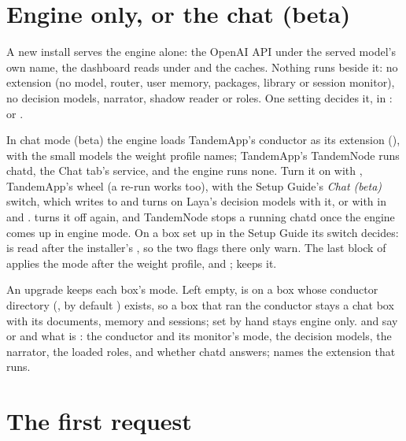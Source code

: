 \section{Engine only, or the chat (beta)}\label{sec:mode}

A new install serves the engine alone: the OpenAI API under the served model's own name, the dashboard reads under  and the caches. Nothing runs beside it: no extension (no  model, router, user memory, packages, library or session monitor), no decision models, narrator, shadow reader or roles. One setting decides it,  in :  or .

In chat mode (beta) the engine loads TandemApp's conductor as its extension (), with the small models the weight profile names; TandemApp's TandemNode runs chatd, the Chat tab's service, and the engine runs none. Turn it on with , TandemApp's wheel (a re-run works too), with the Setup Guide's \emph{Chat (beta)} switch, which writes  to  and turns on Laya's decision models with it, or with  in  and .  turns it off again, and TandemNode stops a running chatd once the engine comes up in engine mode. On a box set up in the Setup Guide its switch decides:  is read after the installer's , so the two flags there only warn. The last block of  applies the mode after the weight profile,  and ;  keeps it.

An upgrade keeps each box's mode. Left empty,  is  on a box whose conductor directory (, by default ) exists, so a box that ran the conductor stays a chat box with its documents, memory and sessions;  set by hand stays engine only.  and  say  or  and what is : the conductor and its monitor's mode, the decision models, the narrator, the loaded roles, and whether chatd answers;  names the extension that runs.

\section{The first request}


